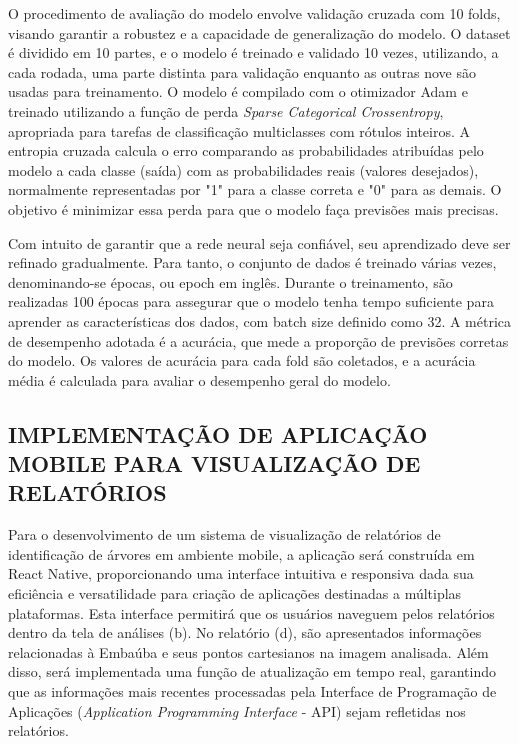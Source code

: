 O procedimento de avaliação do modelo envolve validação cruzada com 10 folds, visando garantir a robustez e a capacidade de generalização do modelo. O dataset é dividido em 10 partes, e o modelo é treinado e validado 10 vezes, utilizando, a cada rodada, uma parte distinta para validação enquanto as outras nove são usadas para treinamento.
O modelo é compilado com o otimizador Adam e treinado utilizando a função de perda \textit{Sparse Categorical Crossentropy}, apropriada para tarefas de classificação multiclasses com rótulos inteiros. A entropia cruzada calcula o erro comparando as probabilidades atribuídas pelo modelo a cada classe (saída) com as probabilidades reais (valores desejados), normalmente representadas por "1" para a classe correta e "0" para as demais. O objetivo é minimizar essa perda para que o modelo faça previsões mais precisas.

Com intuito de garantir que a rede neural seja confiável, seu aprendizado deve ser refinado gradualmente. Para tanto, o conjunto de dados é treinado várias vezes, denominando-se épocas, ou epoch em inglês. Durante o treinamento, são realizadas 100 épocas para assegurar que o modelo tenha tempo suficiente para aprender as características dos dados, com batch size definido como 32. A métrica de desempenho adotada é a acurácia, que mede a proporção de previsões corretas do modelo. Os valores de acurácia para cada fold são coletados, e a acurácia média é calculada para avaliar o desempenho geral do modelo.

\subsection*{IMPLEMENTAÇÃO DE APLICAÇÃO MOBILE PARA VISUALIZAÇÃO DE RELATÓRIOS}

Para o desenvolvimento de um sistema de visualização de relatórios de identificação de árvores em ambiente mobile, a aplicação será construída em React Native, proporcionando uma interface intuitiva e responsiva dada sua eficiência e versatilidade para criação de aplicações destinadas a múltiplas plataformas\cite{(ALMEIDA, 2024)}. Esta interface permitirá que os usuários naveguem pelos relatórios dentro da tela de análises (b). No relatório (d), são apresentados informações relacionadas à Embaúba e seus pontos cartesianos na imagem analisada. Além disso, será implementada uma função de atualização em tempo real, garantindo que as informações mais recentes processadas pela Interface de Programação de Aplicações (\textit{Application Programming Interface} - API) sejam refletidas nos relatórios. 

